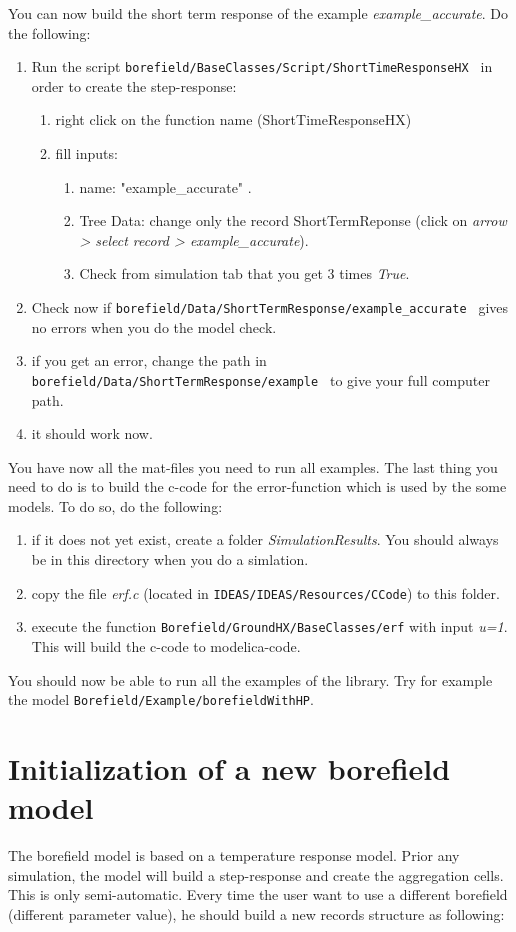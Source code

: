 \documentclass[a4paper,oneside,11pt]{report}
\begin{document}
You can now build the short term response of the example \textit{example\_accurate}. Do the following:
\begin{enumerate}
\item Run the script {\tt borefield/BaseClasses/Script/ShortTimeResponseHX } in order to create the step-response:
	\begin{enumerate}
	\item right click on the function name (ShortTimeResponseHX)
	\item fill inputs:
		\begin{enumerate}
		\item name: "example\_accurate" .
		\item Tree Data: change only the record ShortTermReponse (click on \textit{arrow > select record > example\_accurate}).
		\item Check from simulation tab that you get 3 times \textit{True}. 
		\end{enumerate}
	\end{enumerate}
\item Check now if {\tt borefield/Data/ShortTermResponse/example\_accurate } gives no errors when you do the model check.
\item if you get an error, change the path in {\tt borefield/Data/ShortTermResponse/example } to give your full computer path.
\item it should work now.
\end{enumerate}

You have now all the mat-files you need to run all examples. The last thing you need to do is to build the c-code for the error-function which is used by the some models. To do so, do the following:
\begin{enumerate}
\item if it does not yet exist, create a folder \textit{SimulationResults}. You should always be in this directory when you do a simlation.
\item copy the file \textit{erf.c} (located in {\tt IDEAS/IDEAS/Resources/CCode}) to this folder.
\item execute the function {\tt Borefield/GroundHX/BaseClasses/erf} with input \textit{u=1}. This will build the c-code to modelica-code.
\end{enumerate}

You should now be able to run all the examples of the library. Try for example the model {\tt Borefield/Example/borefieldWithHP}.

\section{Initialization of a new borefield model} \label{sec:ini_mod}
The borefield model is based on a temperature response model. Prior any simulation, the model will build a step-response and create the aggregation cells. This is only semi-automatic. Every time the user want to use a different borefield (different parameter value), he should build a new records structure as following:
\end{document}
